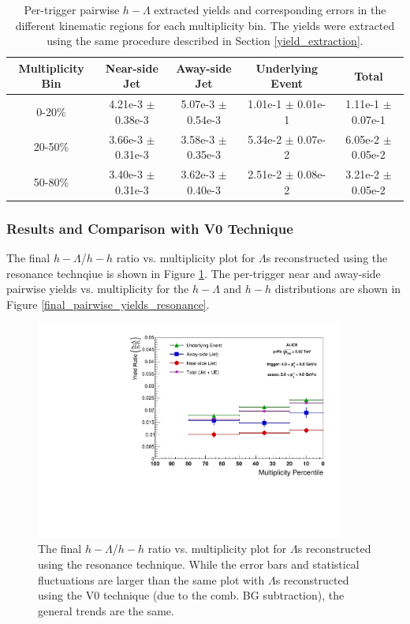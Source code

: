 \documentclass[ALICE,manyauthors]{ALICE_analysis_notes}
\begin{document}
\begin{table}[h!]
\centering
\begin{tabular}{| c | c | c | c | c | }
\hline
Multiplicity Bin & Near-side Jet & Away-side Jet & Underlying Event & Total  \\
\hline
0-20\% & 4.21e-3 $\pm$ 0.38e-3 &  5.07e-3 $\pm$ 0.54e-3 & 1.01e-1 $\pm$ 0.01e-1 & 1.11e-1 $\pm$ 0.07e-1 \\
20-50\% & 3.66e-3 $\pm$ 0.31e-3 & 3.58e-3 $\pm$ 0.35e-3 & 5.34e-2 $\pm$ 0.07e-2 & 6.05e-2 $\pm$ 0.05e-2 \\
50-80\% & 3.40e-3 $\pm$ 0.31e-3 & 3.62e-3 $\pm$ 0.40e-3 & 2.51e-2 $\pm$ 0.08e-2 & 3.21e-2 $\pm$ 0.05e-2 \\
\hline
\end{tabular}
\caption{Per-trigger pairwise $h-\Lambda$ extracted yields and corresponding errors in the different kinematic regions for each multiplicity bin. The yields were extracted using the same procedure described in Section \ref{yield_extraction}.}
\label{yield_table_resonance}
\end{table}

\subsubsection{Results and Comparison with V0 Technique}
The final $h-\Lambda$/$h-h$ ratio vs. multiplicity plot for $\Lambda$s reconstructed using the resonance technqiue is shown in Figure \ref{final_ratio_resonance}. The per-trigger near and away-side pairwise yields vs. multiplicity for the $h-\Lambda$ and $h-h$ distributions are shown in Figure \ref{final_pairwise_yields_resonance}.

\begin{figure}[ht]
\centering
\includegraphics[width=4in]{figures/resonance_ratio_plot_2_4.pdf}
\caption{The final $h-\Lambda$/$h-h$ ratio vs. multiplicity plot for $\Lambda$s reconstructed using the resonance technique. While the error bars and statistical fluctuations are larger than the same plot with $\Lambda$s reconstructed using the V0 technique (due to the comb. BG subtraction), the general trends are the same.}
\label{final_ratio_resonance}
\end{figure}
\end{document}

